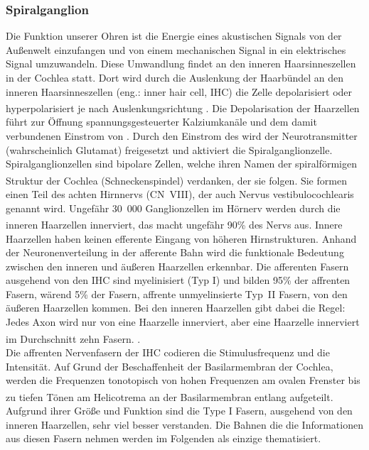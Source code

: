 \documentclass[12pt,a4paper,pdftex]{article}
\begin{document}
\subsubsection*{Spiralganglion}
Die Funktion unserer Ohren ist die Energie eines akustischen Signals von der Außenwelt einzufangen und von einem mechanischen Signal in ein elektrisches Signal umzuwandeln. Diese Umwandlung findet an den inneren Haarsinneszellen in der Cochlea statt. Dort wird durch die Auslenkung der Haarbündel an den inneren Haarsinneszellen (eng.: inner hair cell, IHC)  die Zelle depolarisiert oder hyperpolarisiert je nach Auslenkungsrichtung \textsuperscript{\cite[30]{kandel2013principles}}. Die Depolarisation der Haarzellen führt zur Öffnung spannungsgesteuerter Kalziumkanäle und dem damit verbundenen Einstrom von . Durch den Einstrom des  wird der Neurotransmitter (wahrscheinlich Glutamat) freigesetzt und aktiviert die Spiralganglionzelle. Spiralganglionzellen sind bipolare Zellen, welche ihren Namen der spiralförmigen Struktur der Cochlea (Schneckenspindel)  verdanken, der sie folgen\textsuperscript{\cite[11]{neurowissenschaften_baer}}. Sie formen einen Teil des achten Hirnnervs (CN~VIII), der auch Nervus vestibulocochlearis  genannt wird. Ungefähr 30~000 Ganglionzellen im Hörnerv werden durch die inneren Haarzellen innerviert, das macht ungefähr 90\% des Nervs aus\textsuperscript{\cite[30]{kandel2013principles}}. 
Innere Haarzellen haben keinen efferente Eingang von höheren Hirnstrukturen. Anhand der Neuronenverteilung in der afferente Bahn wird die funktionale Bedeutung zwischen den inneren und äußeren Haarzellen erkennbar. Die afferenten Fasern ausgehend von den IHC sind myelinisiert (Typ I) und bilden 95\% der affrenten Fasern, wärend 5\% der Fasern, affrente unmyelinsierte Typ~II Fasern, von den äußeren Haarzellen kommen. Bei den inneren Haarzellen gibt dabei die Regel: Jedes Axon wird nur von eine Haarzelle innerviert, aber eine Haarzelle innerviert im Durchschnitt zehn Fasern.  \textsuperscript{\cite[30]{kandel2013principles}}.   
\\
\noindent Die affrenten Nervenfasern der IHC codieren die Stimulusfrequenz und die Intensität. Auf Grund der Beschaffenheit der Basilarmembran  der Cochlea, werden die Frequenzen tonotopisch von hohen Frequenzen am ovalen Frenster bis zu tiefen Tönen am Helicotrema  an der Basilarmembran entlang aufgeteilt\textsuperscript{\cite[22]{paxinos2014rat}}. Aufgrund ihrer Größe und Funktion sind die Type I Fasern, ausgehend von den inneren Haarzellen, sehr viel besser verstanden. Die Bahnen die die Informationen aus diesen Fasern nehmen werden im Folgenden als einzige thematisiert.
\end{document}
